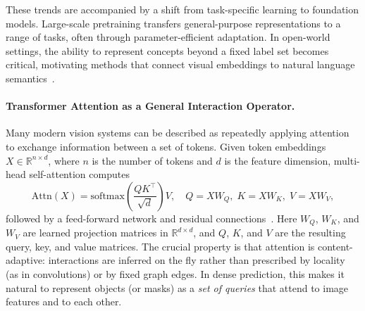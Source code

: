 These trends are accompanied by a shift from task-specific learning to foundation models. Large-scale pretraining transfers general-purpose representations to a range of tasks, often through parameter-efficient adaptation. In open-world settings, the ability to represent concepts beyond a fixed label set becomes critical, motivating methods that connect visual embeddings to natural language semantics~\citep{radford2021learning, zhang2024vision}.

\paragraph{Transformer Attention as a General Interaction Operator.}
Many modern vision systems can be described as repeatedly applying attention to exchange information between a set of tokens. Given token embeddings $X \in \mathbb{R}^{n\times d}$, where $n$ is the number of tokens and $d$ is the feature dimension, multi-head self-attention computes
\begin{equation}
\mathrm{Attn}(X) = \mathrm{softmax}\!\left(\frac{QK^\top}{\sqrt{d}}\right)V,\quad Q=XW_Q,\;K=XW_K,\;V=XW_V,
\end{equation}
followed by a feed-forward network and residual connections~\citep{vaswani2017attention}. Here $W_Q$, $W_K$, and $W_V$ are learned projection matrices in $\mathbb{R}^{d\times d}$, and $Q$, $K$, and $V$ are the resulting query, key, and value matrices. The crucial property is that attention is content-adaptive: interactions are inferred on the fly rather than prescribed by locality (as in convolutions) or by fixed graph edges. In dense prediction, this makes it natural to represent objects (or masks) as a \emph{set of queries} that attend to image features and to each other.

